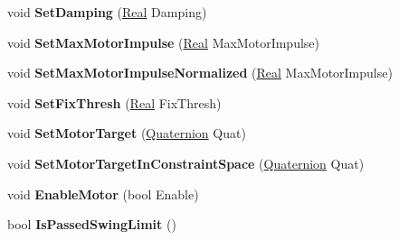 \begin{DoxyCompactItemize}
\item 
\hypertarget{classphys_1_1ConeTwistConstraint_ae93045d83384dccc89f638fa8857caf1}{
void {\bfseries SetDamping} (\hyperlink{namespacephys_af7eb897198d265b8e868f45240230d5f}{Real} Damping)}
\label{da/dbc/classphys_1_1ConeTwistConstraint_ae93045d83384dccc89f638fa8857caf1}

\item 
\hypertarget{classphys_1_1ConeTwistConstraint_a005bf25bd529a03c6678e048941ea83f}{
void {\bfseries SetMaxMotorImpulse} (\hyperlink{namespacephys_af7eb897198d265b8e868f45240230d5f}{Real} MaxMotorImpulse)}
\label{da/dbc/classphys_1_1ConeTwistConstraint_a005bf25bd529a03c6678e048941ea83f}

\item 
\hypertarget{classphys_1_1ConeTwistConstraint_af39f9da7e28591e3361568b3ad1c8eb8}{
void {\bfseries SetMaxMotorImpulseNormalized} (\hyperlink{namespacephys_af7eb897198d265b8e868f45240230d5f}{Real} MaxMotorImpulse)}
\label{da/dbc/classphys_1_1ConeTwistConstraint_af39f9da7e28591e3361568b3ad1c8eb8}

\item 
\hypertarget{classphys_1_1ConeTwistConstraint_a2a2a68b116e99709be83d08dbd3a99f9}{
void {\bfseries SetFixThresh} (\hyperlink{namespacephys_af7eb897198d265b8e868f45240230d5f}{Real} FixThresh)}
\label{da/dbc/classphys_1_1ConeTwistConstraint_a2a2a68b116e99709be83d08dbd3a99f9}

\item 
\hypertarget{classphys_1_1ConeTwistConstraint_a5acf239ac6ff3b5999d81d27ba287414}{
void {\bfseries SetMotorTarget} (\hyperlink{classphys_1_1Quaternion}{Quaternion} Quat)}
\label{da/dbc/classphys_1_1ConeTwistConstraint_a5acf239ac6ff3b5999d81d27ba287414}

\item 
\hypertarget{classphys_1_1ConeTwistConstraint_a4ac6124494fa39770f9fc621e6db3715}{
void {\bfseries SetMotorTargetInConstraintSpace} (\hyperlink{classphys_1_1Quaternion}{Quaternion} Quat)}
\label{da/dbc/classphys_1_1ConeTwistConstraint_a4ac6124494fa39770f9fc621e6db3715}

\item 
\hypertarget{classphys_1_1ConeTwistConstraint_aaf0447bbeeca85fa10959072491cafaf}{
void {\bfseries EnableMotor} (bool Enable)}
\label{da/dbc/classphys_1_1ConeTwistConstraint_aaf0447bbeeca85fa10959072491cafaf}

\item 
\hypertarget{classphys_1_1ConeTwistConstraint_ab7306ac08c3fd61cf88567b4e70702c0}{
bool {\bfseries IsPassedSwingLimit} ()}
\label{da/dbc/classphys_1_1ConeTwistConstraint_ab7306ac08c3fd61cf88567b4e70702c0}


\end{DoxyCompactItemize}
